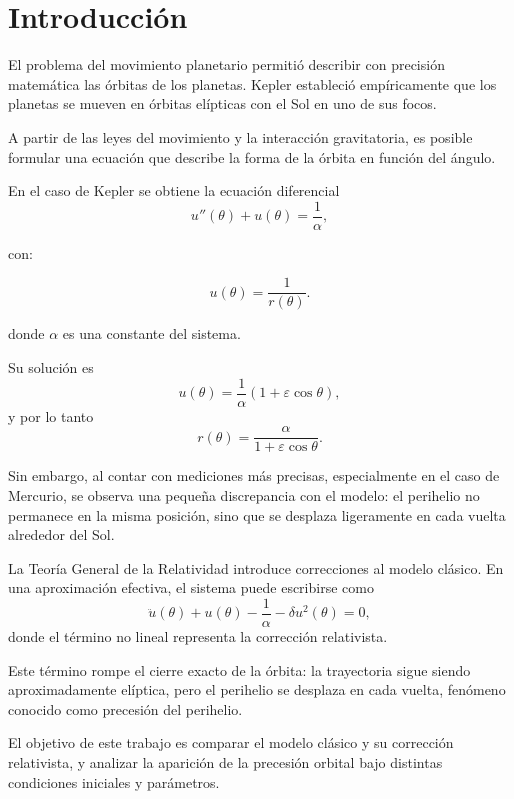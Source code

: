 \documentclass[10pt,a4paper]{article}
\begin{document}
\maketitle

\section*{Introducción}

El problema del movimiento planetario permitió describir con precisión matemática las órbitas de los planetas. Kepler estableció empíricamente que los planetas se mueven en órbitas elípticas con el Sol en uno de sus focos.

A partir de las leyes del movimiento y la interacción gravitatoria, es posible formular una ecuación que describe la forma de la órbita en función del ángulo.


En el caso de Kepler se obtiene la ecuación diferencial
\[
u''(\theta)+u(\theta)=\frac{1}{\alpha},
\]

con:

\[
u(\theta)=\frac{1}{r(\theta)}.
\]


donde \(\alpha\) es una constante del sistema.

\vspace{0.75 cm}

Su solución es
\[
u(\theta)=\frac{1}{\alpha}\left(1+\varepsilon\cos\theta\right),
\]
y por lo tanto
\[
r(\theta)=\frac{\alpha}{1+\varepsilon\cos\theta}.
\]


Sin embargo, al contar con mediciones más precisas, especialmente en el caso de Mercurio, se observa una pequeña discrepancia con el modelo: el perihelio no permanece en la misma posición, sino que se desplaza ligeramente en cada vuelta alrededor del Sol.

La Teoría General de la Relatividad introduce correcciones al modelo clásico. En una aproximación efectiva, el sistema puede escribirse como
\[
\ddot{u}(\theta)+u(\theta)-\frac{1}{\alpha}-\delta u^{2}(\theta)=0,
\]
donde el término no lineal representa la corrección relativista.

Este término rompe el cierre exacto de la órbita: la trayectoria sigue siendo aproximadamente elíptica, pero el perihelio se desplaza en cada vuelta, fenómeno conocido como precesión del perihelio.

El objetivo de este trabajo es comparar el modelo clásico y su corrección relativista, y analizar la aparición de la precesión orbital bajo distintas condiciones iniciales y parámetros.
\end{document}
